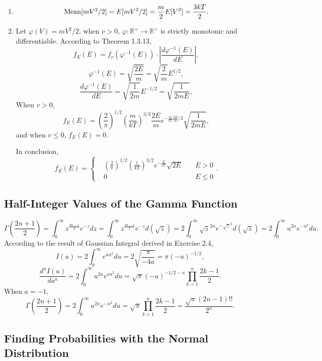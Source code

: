\documentclass[11pt,a4paper]{article}
\begin{document}
\begin{enumerate}[label=\roman*)]
\item
$${\rm Mean}[mV^2/2]=E[mV^2/2]=\frac{m}{2}E[V^2]=\frac{3kT}{2}.$$
\item
Let $\varphi(V)=mV^2/2$, when $v>0$, $\varphi:\mathbb{R}^+\to\mathbb{R}^+$ is strictly monotonic and differentiable. According to Theorem 1.3.13,
$$f_E(E)=f_v(\varphi^{-1}(E))\cdot\left|\frac{d\varphi^{-1}(E)}{dE}\right|,$$
$$\varphi^{-1}(E)=\sqrt{\frac{2E}{m}}=\sqrt{\frac{2}{m}}E^{1/2},$$
$$\frac{d\varphi^{-1}(E)}{dE}=\sqrt{\frac{1}{2m}}E^{-1/2}=\sqrt{\frac{1}{2mE}},$$
When $v>0$,
$$f_E(E)=\left(\frac{2}{\pi}\right)^{1/2}\left(\frac{m}{kT}\right)^{3/2}\frac{2E}{m}e^{-\frac{m}{kT}\frac{2E}{m}/2}\sqrt{\frac{1}{2mE}},$$
and when $v\leqslant 0$, $f_E(E)=0$.

In conclusion,
$$f_E(E)=\left\{\begin{aligned}
&\left(\frac{2}{\pi}\right)^{1/2}\left(\frac{1}{kT}\right)^{3/2}e^{-\frac{E}{kT}}\sqrt{2E}&\quad E>0\\
&0&\quad E\leqslant0
\end{aligned}\right..$$
\end{enumerate}

\subsection{Half-Integer Values of the Gamma Function}

$$\Gamma\left(\frac{2n+1}{2}\right)=\int_0^\infty z^{\frac{2n-1}{2}}e^{-z}dz=\int_0^\infty z^{\frac{2n-1}{2}}e^{-z}d(\sqrt{z})=2\int_0^\infty\sqrt{z}^{2n}e^{-\sqrt{z}^2}d(\sqrt{z})=2\int_0^\infty u^{2n}e^{-u^2}du.$$
According to the result of Gaussian Integral derived in Exercise 2.4,
$$I(a)=2\int_0^\infty e^{au^2}du=2\sqrt{\frac{\pi}{-4a}}=\pi(-a)^{-1/2},$$
$$\frac{d^nI(a)}{da^n}=2\int_0^\infty u^{2n}e^{au^2}du=\sqrt{\pi}(-a)^{-1/2-n}\prod_{k=1}^n\frac{2k-1}{2}.$$
When $a=-1$,
$$\Gamma\left(\frac{2n+1}{2}\right)=2\int_0^\infty u^{2n}e^{-u^2}du=\sqrt{\pi}\prod_{k=1}^n\frac{2k-1}{2}=\frac{\sqrt{\pi}(2n-1)!!}{2^n}.$$

\subsection{Finding Probabilities with the Normal Distribution}
\end{document}
